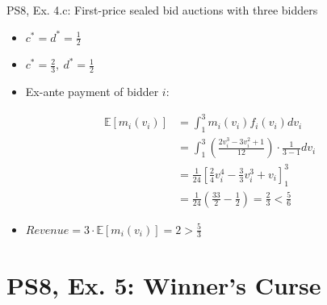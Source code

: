 \begin{frame}{PS8, Ex. 4.c: First-price sealed bid auctions with three bidders}
\begin{multicols}{2}
\begin{itemize}
        \item[(3.a)] $c^*=d^*=\frac{1}{2}$
        \item[(4.a)] $c^*=\frac{2}{3},\ d^*=\frac{1}{2}$
        \item[\nth{2}:] Ex-ante payment of bidder $i$:
      \end{itemize}
      \vspace{-12pt}
      \begin{align*}
        \mathbb{E}[m_i(v_i)]&=\textstyle\int_1^3m_i(v_i)f_i(v_i)dv_i\\
                            &=\textstyle\int_1^3\left(\frac{2v_i^3-3v_i^2+1}{12}\right)\cdot\frac{1}{3-1}dv_i\\
                            &=\frac{1}{24}\left[\frac{2}{4}v_i^4-\frac{3}{3}v_i^3+v_i\right]_1^3\\
                            &=\frac{1}{24}\left(\frac{33}{2}-\frac{1}{2}\right)=\frac{2}{3}<\frac{5}{6}
      \end{align*}
      \vspace{-16pt}
      \begin{itemize}
        \item[\nth{3}:] $Revenue=3\cdot\mathbb{E}[m_i(v_i)]=2>\frac{5}{3}$
      \end{itemize}
      \vspace{-6pt}
      \vfill\null
    \end{multicols}
    \vfill\null
\end{frame}



\section{PS8, Ex. 5: Winner's Curse}

